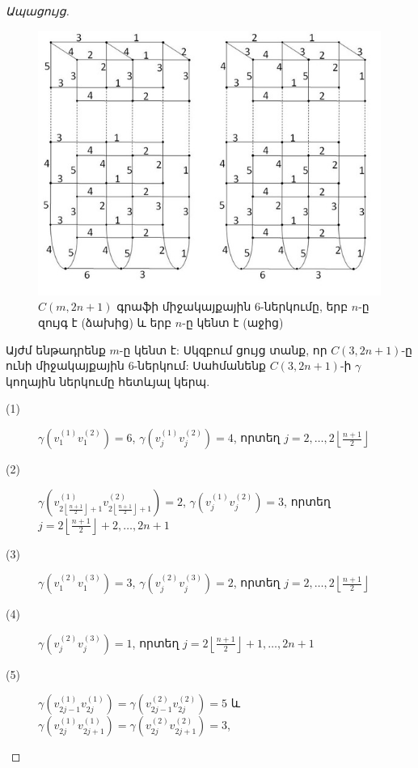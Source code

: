 \begin{proof}[Ապացույց]
\begin{figure}[b!]
\centering
\includegraphics[width=145mm]{figures/cylinders.jpg}
\caption{$C(m,2n+1)$ գրաֆի միջակայքային 6-ներկումը, երբ $n$-ը զույգ է (ձախից) և երբ $n$-ը կենտ է (աջից)}
\label{cylinders}
\end{figure}

Այժմ ենթադրենք $m$-ը կենտ է: Սկզբում ցույց տանք, որ $C(3,2n+1)$-ը ունի միջակայքային $6$-ներկում: Սահմանենք $C(3,2n+1)$-ի $\gamma$ կողային ներկումը հետևյալ կերպ.
\begin{description}
\item[(1)]
$\gamma\left(v_{1}^{(1)}v_{1}^{(2)}\right)=6$, $\gamma\left(v_{j}^{(1)}v_{j}^{(2)}\right)=4$, որտեղ $j=2,\ldots,2\left\lfloor\frac{n+1}{2}\right\rfloor$
\item[(2)]
$\gamma\left(v_{2\left\lfloor\frac{n+1}{2}\right\rfloor+1}^{(1)}v_{2\left\lfloor\frac{n+1}{2}\right\rfloor+1}^{(2)}\right)=2$, $\gamma\left(v_{j}^{(1)}v_{j}^{(2)}\right)=3$, որտեղ  $j=2\left\lfloor\frac{n+1}{2}\right\rfloor+2,\ldots,2n+1$
\item[(3)]
$\gamma\left(v_{1}^{(2)}v_{1}^{(3)}\right)=3$, $\gamma\left(v_{j}^{(2)}v_{j}^{(3)}\right)=2$, որտեղ $j=2,\ldots,2\left\lfloor\frac{n+1}{2}\right\rfloor$
\item[(4)]
$\gamma\left(v_{j}^{(2)}v_{j}^{(3)}\right)=1$, որտեղ $j=2\left\lfloor\frac{n+1}{2}\right\rfloor+1,\ldots,2n+1$
\item[(5)]

$\gamma\left(v_{2j-1}^{(1)}v_{2j}^{(1)}\right)=\gamma\left(v_{2j-1}^{(2)}v_{2j}^{(2)}\right)=5$
և
$\gamma\left(v_{2j}^{(1)}v_{2j+1}^{(1)}\right)=\gamma\left(v_{2j}^{(2)}v_{2j+1}^{(2)}\right)=3$,


\end{description}
\end{proof}
